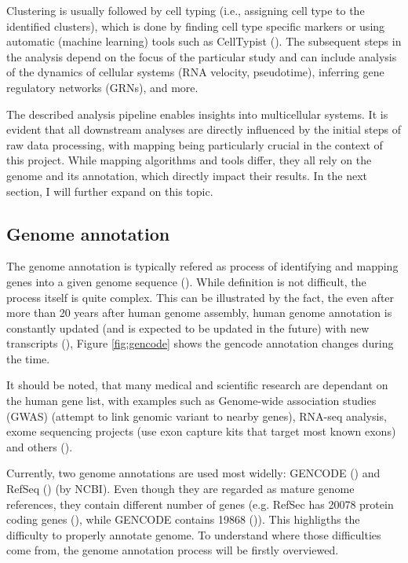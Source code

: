 \begin{itemize}
Clustering is usually followed by cell typing (i.e., assigning cell type to the identified clusters),
which is done by finding cell type specific markers
or using automatic (machine learning) tools such as CellTypist (\cite{Dom2022}).
The subsequent steps in the analysis depend on the focus of the particular study and can include
analysis of the dynamics of cellular systems (RNA velocity, pseudotime),
inferring gene regulatory networks (GRNs), and more.
\end{itemize}

The described analysis pipeline enables insights into multicellular systems.
It is evident that all downstream analyses are directly influenced by the initial steps of raw data processing,
with mapping being particularly crucial in the context of this project.
While mapping algorithms and tools differ, they all rely on the genome and its annotation,
which directly impact their results.
In the next section, I will further expand on this topic.

\subsection{Genome annotation}

The genome annotation is typically refered as process of identifying and mapping genes into a given genome sequence (\cite{Guigo2023}).
While definition is not difficult, the process itself is quite complex.
This can be illustrated by the fact, the even after more than 20 years after human genome assembly,
human genome annotation is constantly updated (and is expected to be updated in the future) with new transcripts (\cite{Mudge2024}),
Figure \ref{fig:gencode} shows the gencode annotation changes during the time.

It should be noted, that many medical and scientific research are dependant on the human gene list,
with examples such as Genome-wide association studies (GWAS) (attempt to link genomic variant to nearby genes), RNA-seq analysis,
exome sequencing projects (use exon capture kits that target most known exons) and others (\cite{Pertea2018}).

Currently, two genome annotations are used most widelly: GENCODE (\cite{Mudge2024}) and RefSeq (\cite{OLeary2015}) (by NCBI).
Even though they are regarded as mature genome references, they contain different number of genes
(e.g. RefSec has 20078 protein coding genes (\cite{ncbi}), while GENCODE contains 19868 (\cite{ensembl})).
This highligths the difficulty to properly annotate genome.
To understand where those difficulties come from, the genome annotation process will be firstly overviewed.

